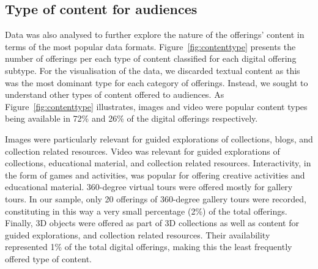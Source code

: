 \documentclass{egpubl}
\begin{document}
\subsection{Type of content for audiences}
Data was also analysed to further explore the nature of the offerings' content in terms of the most popular data formats. Figure~\ref{fig:contenttype} presents the number of offerings per each type of content classified for each digital offering subtype. For the visualisation of the data, we discarded textual content as this was the most dominant type for each category of offerings. Instead, we sought to understand other types of content offered to audiences. As Figure~\ref{fig:contenttype} illustrates, images and video were popular content types being available in 72\% and 26\% of the digital offerings respectively. 

Images were particularly relevant for guided explorations of collections, blogs, and collection related resources. Video was relevant for guided explorations of collections, educational material, and  collection related resources. Interactivity, in the form of games and activities, was popular for offering creative activities and educational material. 360-degree virtual tours were offered mostly for gallery tours. In our sample, only 20 offerings of 360-degree gallery tours were recorded, constituting in this way a very small percentage (2\%) of the total offerings. Finally, 3D objects were offered as part of 3D collections  as well as content for guided explorations, and collection related resources. Their availability represented 1\% of the total digital offerings, making this the least frequently offered type of content. 
 
\end{document}
